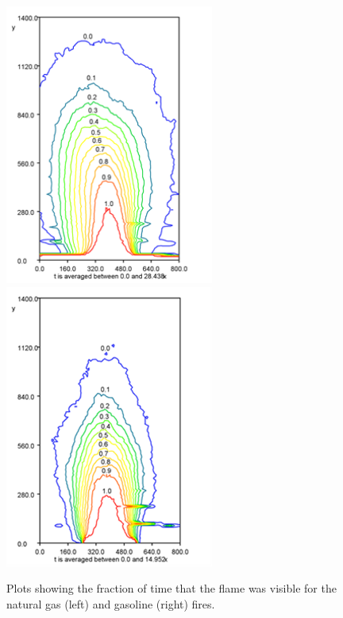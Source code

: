 \documentclass[twoside]{uocthesis}
\begin{document}
{\begin{figure}
  \includegraphics[width=2.7in]{../Figures/Fig20}
  \includegraphics[width=2.7in]{../Figures/Fig21} \\
  \caption[Visibility fractions for the natural gas and gasoline fires]{Plots showing the fraction of time that the flame was visible for the natural gas (left) and gasoline (right) fires.}
  \label{Gas_and_Gasoline_Contours}
\end{figure}

}
\end{document}
